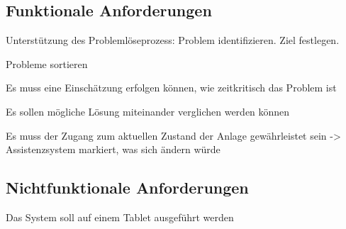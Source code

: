 \subsection{Funktionale Anforderungen}

Unterstützung des Problemlöseprozess: Problem identifizieren. Ziel festlegen.

Probleme sortieren

Es muss eine Einschätzung erfolgen können, wie zeitkritisch das Problem ist

Es sollen mögliche Lösung miteinander verglichen werden können

Es muss der Zugang zum aktuellen Zustand der Anlage gewährleistet sein
-> Assistenzsystem markiert, was sich ändern würde

\subsection{Nichtfunktionale Anforderungen}

Das System soll auf einem Tablet ausgeführt werden
